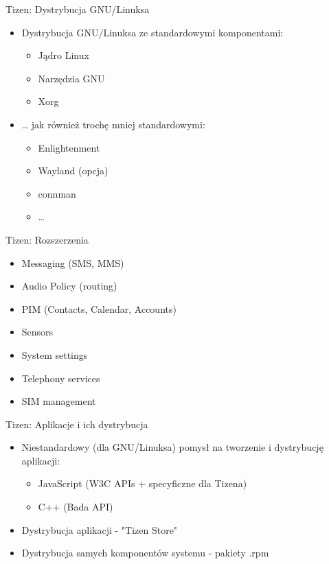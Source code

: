 \documentclass[presentation,aspectratio=43,12pt]{beamer}
\begin{document}
\begin{frame}[label=sec-1-2]{Tizen: Dystrybucja GNU/Linuksa}
\begin{itemize}
\item Dystrybucja GNU/Linuksa ze standardowymi komponentami:
\begin{itemize}
\item Jądro Linux
\item Narzędzia GNU
\item Xorg
\end{itemize}

\item \ldots{} jak również trochę mniej standardowymi:
\begin{itemize}
\item Enlightenment
\item Wayland (opcja)
\item connman
\item \ldots{}
\end{itemize}
\end{itemize}

\end{frame}
\begin{frame}[label=sec-1-3]{Tizen: Rozszerzenia}
\begin{itemize}
\item Messaging (SMS, MMS)
\item Audio Policy (routing)
\item PIM (Contacts, Calendar, Accounts)
\item Sensors
\item System settings
\item Telephony services
\item SIM management
\end{itemize}

\end{frame}

\begin{frame}[label=sec-1-4]{Tizen: Aplikacje i ich dystrybucja}
\begin{itemize}
\item Niestandardowy (dla GNU/Linuksa) pomysł na tworzenie i dystrybucję
aplikacji:

\begin{itemize}
\item JavaScript (W3C APIs + specyficzne dla Tizena)
\item C++ (Bada API)
\end{itemize}

\item Dystrybucja aplikacji - "Tizen Store"
\end{itemize}



\begin{itemize}
\item <2-> Dystrybucja samych komponentów systemu - pakiety .rpm
\end{itemize}
\end{frame}
\end{document}
